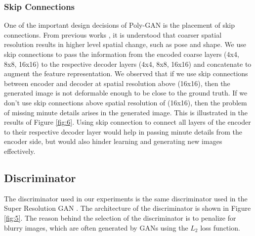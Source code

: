 \documentclass[11pt]{article}
\begin{document}
\subsubsection{Skip Connections}
One of the important design decisions of Poly-GAN is the placement of skip connections. 
From previous works \citet{StyleGAN}, it is understood that coarser spatial resolution results in higher level spatial change, such as pose and shape. 
We use skip connections to pass the information from the encoded coarse layers (4x4, 8x8, 16x16) to the respective decoder layers (4x4, 8x8, 16x16) and concatenate to augment the feature representation. 
We observed that if we use skip connections between encoder and decoder at spatial resolution above (16x16), then the generated image is not deformable enough to be close to the ground truth. If we don't use skip connections above spatial resolution of (16x16), then the problem of missing minute details arises in the generated image. This is illustrated in the results of Figure \ref{fig:6}. 
Using skip connection to connect all layers of the encoder to their respective decoder layer would help in passing minute details from the encoder side, but would also hinder learning and generating new images effectively.

\subsection{Discriminator}
The discriminator used in our experiments is the same discriminator used in the Super Resolution GAN \citet{SRGAN}.
The architecture of the discriminator is shown in Figure \ref{fig:5}.
The reason behind the selection of the discriminator is to penalize for blurry images, which are often generated by GANs using the $L_{2}$ loss function.
\end{document}
